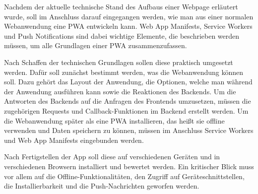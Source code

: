 Nachdem der aktuelle technische Stand des Aufbaus einer Webpage erläutert wurde, soll im Anschluss darauf eingegangen werden, wie man aus einer normalen Webanwendung eine PWA entwickeln kann. Web App Manifests, Service Workers und Push Notifications sind dabei wichtige Elemente, die beschrieben werden müssen, um alle Grundlagen einer PWA zusammenzufassen. 

Nach Schaffen der technischen Grundlagen sollen diese praktisch umgesetzt werden. Dafür soll zunächst bestimmt werden, was die Webanwendung können soll. Dazu gehört das Layout der Anwendung, die Optionen, welche man während der Anwendung ausführen kann sowie die Reaktionen des Backends. Um die Antworten des Backends auf die Anfragen des Frontends umzusetzen, müssen die zugehörigen Requests und Callback-Funktionen im Backend erstellt werden. Um die Webanwendung später als eine PWA installieren, das heißt sie offline verwenden und Daten speichern zu können, müssen im Anschluss Service Workers und Web App Manifests eingebunden werden.

Nach Fertigstellen der App soll diese auf verschiedenen Geräten und in verschiedenen Browsern installiert und bewertet werden. Ein kritischer Blick muss vor allem auf die Offline-Funktionalitäten, den Zugriff auf Geräteschnittstellen, die Installierbarkeit und die Push-Nachrichten geworfen werden. 

